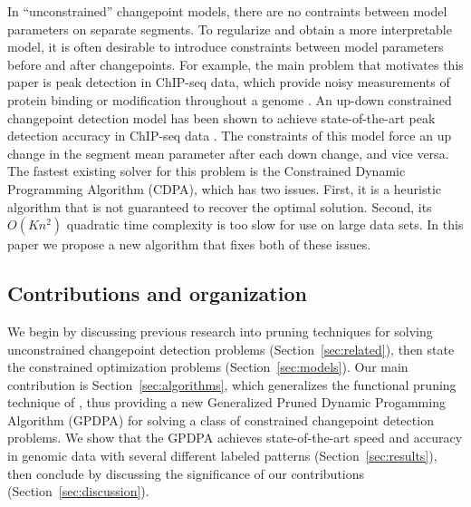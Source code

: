 \documentclass{article}
\begin{document}
In ``unconstrained'' changepoint models, there are no contraints
between model parameters on separate segments. To regularize and obtain a more
interpretable model, it is often desirable to introduce constraints
between model parameters before and after changepoints. 
For example, the main problem that motivates this paper is peak
detection in ChIP-seq data, which provide noisy measurements of
protein binding or modification throughout a genome \citep{practical}. An
up-down constrained changepoint detection model has been shown to
achieve state-of-the-art peak detection accuracy in ChIP-seq data
\citep{HOCKING-PeakSeg}. The constraints of this model force an up
change in the segment mean parameter after each down change, and vice
versa.
The fastest existing solver for this problem is the Constrained
Dynamic Programming Algorithm (CDPA), which has two issues. First, it
is a heuristic algorithm that is not guaranteed to recover the optimal
solution. Second, its $O(Kn^2)$ quadratic time complexity is too slow
for use on large data sets. In this
paper we propose a new algorithm that fixes both of these issues.

\subsection{Contributions and organization}

We begin by discussing previous research into pruning techniques for
solving unconstrained changepoint detection problems
(Section~\ref{sec:related}), then state the constrained optimization
problems (Section~\ref{sec:models}). Our main contribution is
Section~\ref{sec:algorithms}, which generalizes the functional pruning
technique of \citet{pruned-dp}, thus providing a new Generalized
Pruned Dynamic Progamming Algorithm (GPDPA) for solving a class of
constrained changepoint detection problems. We show that the GPDPA
achieves state-of-the-art speed and accuracy in genomic data with
several different labeled patterns (Section~\ref{sec:results}), then
conclude by discussing the significance of our contributions
(Section~\ref{sec:discussion}).
\end{document}
